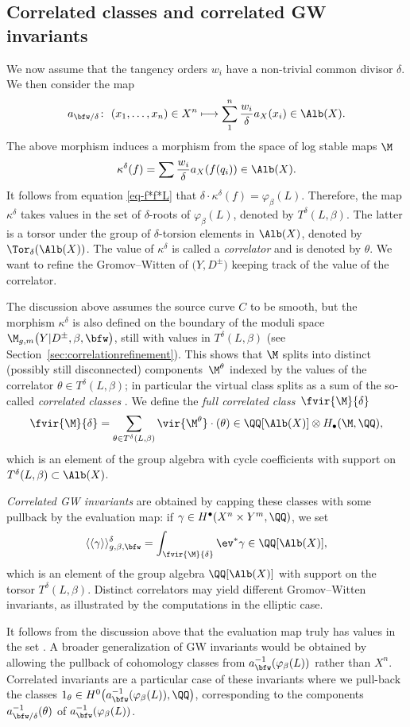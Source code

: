 \subsection{Correlated classes and correlated GW invariants} We now assume that the tangency orders $w_i$ have a non-trivial common divisor $\delta$. We then consider the map
\[
a_{\bfw/\delta}\colon\ (x_1,\dots,x_n)\in X^n\longmapsto\sum_1^n\frac{w_i}{\delta}a_X(x_i)\in \Alb(X).
 \]
The above morphism induces a morphism from the space of log stable maps $\M$
\[\kappa^\delta(f)=\sum \frac{w_i}{\delta}a_X(f(q_i))\in\Alb(X).\]
It follows from equation \eqref{eq-f*f*L} that
$\delta\cdot\kappa^\delta(f)=\varphi_\beta(L)$.
Therefore, the map $\kappa^\delta$ takes values in the set of $\delta$-roots of $\varphi_\beta(L)$, denoted by $T^\delta(L,\beta)$. The latter is a torsor under the group of $\delta$-torsion elements in $\Alb(X)$, denoted by $\Tor_\delta(\Alb(X))$.
The value of $\kappa^\delta$ is called a \textit{correlator} and is denoted by $\theta$.
We want to refine the Gromov--Witten of $\bigl(Y,D^{\pm}\bigr)$ keeping track of the value of the correlator.

The discussion above assumes the source curve $C$ to be smooth, but the morphism $\kappa^\delta$
is also defined on the boundary of the moduli space $\M_{g,m}\bigl(Y|D^{\pm},\beta,\bfw\bigr)$, still with values in $T^\delta(L,\beta)$ (see Section~\ref{sec:correlationrefinement}).
This shows that
 $\M$ splits into distinct (possibly still disconnected) components~$\M^\theta$ indexed by the values of the correlator $\theta\in T^\delta(L,\beta)$; in particular the virtual class splits as a sum of the so-called \textit{correlated classes} \smash{$\vir{\M^\theta}$}. We define the \textit{full correlated class}~$\fvir{\M}{\delta}$
\[ \fvir{\M}{\delta}=\sum_{\theta\in T^\delta(L,\beta)} \vir{\M^\theta}\cdot(\theta)\in \QQ[\Alb(X)]\otimes H_\bullet(\M,\QQ), \]
which is an element of the group algebra with cycle coefficients with support on $T^\delta(L,\beta)\subset\Alb(X)$.

\textit{Correlated GW invariants} are obtained by capping these classes with some pullback by the evaluation map: if $\gamma\in H^\bullet(X^n\times Y^m,\QQ)$, we set
\[ \langle\langle\gamma\rangle\rangle^\delta_{g,\beta,\bfw} = \int_{\fvir{\M}{\delta}}\ev^*\gamma \in\QQ[\Alb(X)], \]
which is an element of the group algebra $\QQ[\Alb(X)]$ with support on the torsor $T^\delta(L,\beta)$. Distinct correlators may yield different Gromov--Witten invariants, as illustrated by the computations in the elliptic case.

It follows from the discussion above that the evaluation map truly has values in the set . A broader generalization of GW invariants would be obtained by allowing the pullback of cohomology classes from $a_\bfw^{-1}(\varphi_\beta(L))$ rather than $X^n$. Correlated invariants are a particular case of these invariants where we pull-back the classes $1_\theta\in H^0\bigl(a_\bfw^{-1}(\varphi_\beta(L)),\QQ\bigr)$, corresponding to the components $a_{\bfw/\delta}^{-1}(\theta)$ of $a_{\bfw}^{-1}(\varphi_\beta(L))$.


